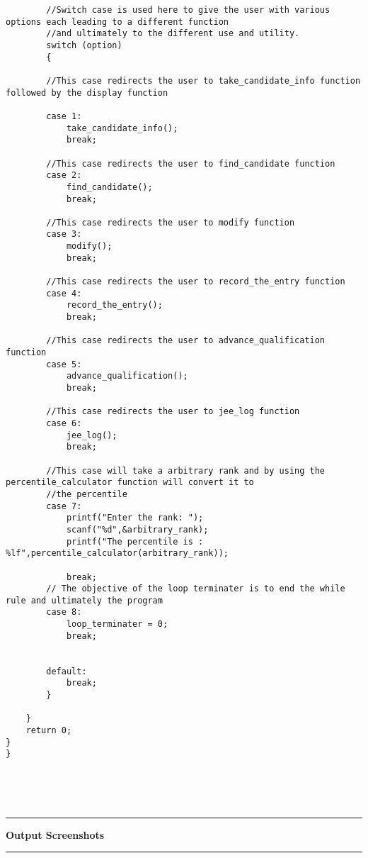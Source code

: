 \documentclass{article}
\begin{document}
\begin{FlushLeft}
\begin{verbatim}
        //Switch case is used here to give the user with various options each leading to a different function 
        //and ultimately to the different use and utility.
        switch (option)
        {

        //This case redirects the user to take_candidate_info function followed by the display function
        
        case 1:
            take_candidate_info();
            break;

        //This case redirects the user to find_candidate function
        case 2:
            find_candidate();
            break;

        //This case redirects the user to modify function
        case 3:
            modify();
            break;

        //This case redirects the user to record_the_entry function
        case 4:
            record_the_entry();         
            break;
        
        //This case redirects the user to advance_qualification function
        case 5:
            advance_qualification();
            break;
        
        //This case redirects the user to jee_log function
        case 6:
            jee_log();
            break;
        
        //This case will take a arbitrary rank and by using the percentile_calculator function will convert it to
        //the percentile
        case 7:
            printf("Enter the rank: ");
            scanf("%d",&arbitrary_rank);
            printf("The percentile is : %lf",percentile_calculator(arbitrary_rank));
            
            break; 
        // The objective of the loop terminater is to end the while rule and ultimately the program
        case 8:
            loop_terminater = 0;
            break;
        
        
        default:
            break;
        }
        
    }
    return 0;
} 
} 



    
\end{verbatim}
\end{FlushLeft}
\vspace{5mm}
\par\noindent\rule{\textwidth}{1 pt}
\pagebreak

\vspace{5mm}
\begin{center}
{\Large\textbf{Output Screenshots }}
\par\noindent\rule{\textwidth}{1 pt}
\end{center}\\
\end{document}
